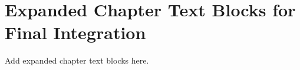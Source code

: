 \chapter{Expanded Chapter Text Blocks for Final Integration}

Add expanded chapter text blocks here.
